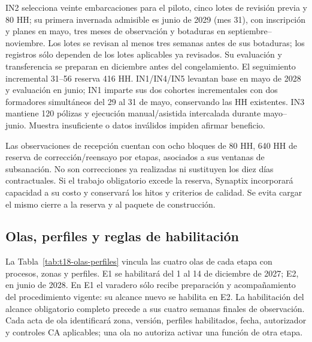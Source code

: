 IN2 selecciona veinte embarcaciones para el piloto, cinco lotes de revisión previa y 80 HH; su primera invernada admisible es junio de 2029 (mes 31), con inscripción y planes en mayo, tres meses de observación y botaduras en septiembre--noviembre. Los lotes se revisan al menos tres semanas antes de sus botaduras; los registros sólo dependen de los lotes aplicables ya revisados. Su evaluación y transferencia se preparan en diciembre antes del congelamiento. El seguimiento incremental 31--56 reserva 416 HH. IN1/IN4/IN5 levantan base en mayo de 2028 y evaluación en junio; IN1 imparte sus dos cohortes incrementales con dos formadores simultáneos del 29 al 31 de mayo, conservando las HH existentes. IN3 mantiene 120 pólizas y ejecución manual/asistida intercalada durante mayo--junio. Muestra insuficiente o datos inválidos impiden afirmar beneficio.

Las observaciones de recepción cuentan con ocho bloques de 80 HH, 640 HH de reserva de corrección/reensayo por etapas, asociados a sus ventanas de subsanación. No son correcciones ya realizadas ni sustituyen los diez días contractuales. Si el trabajo obligatorio excede la reserva, Synaptix incorporará capacidad a su costo y conservará los hitos y criterios de calidad. Se evita cargar el mismo cierre a la reserva y al paquete de construcción.




\subsection{Olas, perfiles y reglas de habilitación} %
La Tabla~\ref{tab:t18-olas-perfiles} vincula las cuatro olas de cada etapa con procesos, zonas y perfiles. E1 se habilitará del 1 al 14 de diciembre de 2027; E2, en junio de 2028. En E1 el varadero sólo recibe preparación y acompañamiento del procedimiento vigente: su alcance nuevo se habilita en E2. La habilitación del alcance obligatorio completo precede a sus cuatro semanas finales de observación. Cada acta de ola identificará zona, versión, perfiles habilitados, fecha, autorizador y controles CA aplicables; una ola no autoriza activar una función de otra etapa.

